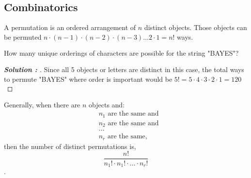\documentclass[11pt]{article}
\newenvironment{solution}[1][]{%
  \renewcommand\qedsymbol{$\blacksquare$}%
  \def\temp{\normalfont\bfseries Solution \theexample: #1}
  \begin{proof}[\temp]
  \normalfont %
}{%
  \end{proof}
}
\begin{document}
\subsection{Combinatorics}

\begin{definition}
    A permutation is an ordered arrangement of $n$ distinct objects. Those objects can be permuted
    $n \cdot (n-1) \cdot (n-2) \cdot (n-3) \dots 2 \cdot 1 = n!$ ways.
\end{definition}

\begin{example}
    How many unique orderings of characters are possible for the string "BAYES"?
\end{example}
\begin{solution}
    Since all 5 objects or letters are distinct in this case, the total ways to permute "BAYES" where order is important would be
    $5! = 5 \cdot 4 \cdot 3 \cdot 2 \cdot 1 = 120$
\end{solution}

\begin{definition}
    Generally, when there are $n$ objects and:
    \begin{align*}
        &n_{1} \text{ are the same and}\\
        &n_{2} \text{ are the same and}\\
        &\dots\\
        &n_{r} \text{ are the same,}
    \end{align*}
    then the number of distinct permutations is, $$\frac{n!}{n_{1}! \cdot n_{1}! \cdot \dots \cdot n_{r}!}$$.
\end{definition}

% 
% 
\end{document}
